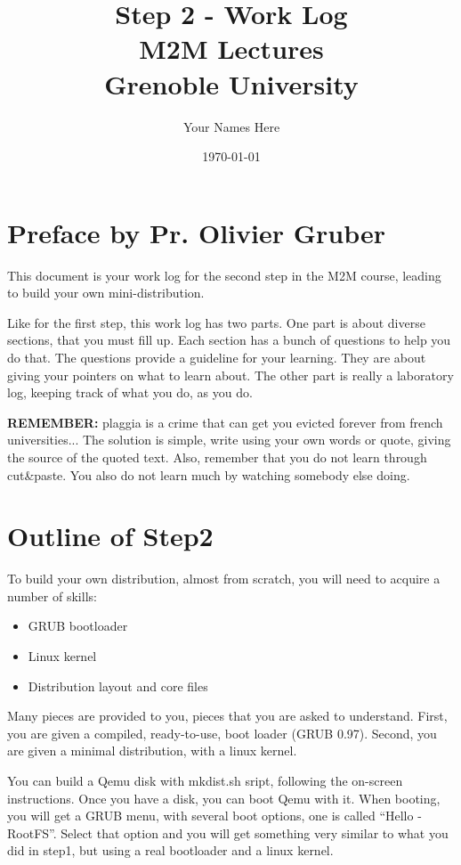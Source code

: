\documentclass[10]{article}
\begin{document}
\title{Step 2 - Work Log \\
M2M Lectures\\
Grenoble University}
\author{Your Names Here}
\date{\today}
\maketitle

\section{Preface by Pr. Olivier Gruber}

This document is your work log for the second step in the 
M2M course, leading to build your own mini-distribution.

Like for the first step, this work log has two parts. 
One part is about diverse sections, that you must fill up.
Each section has a bunch of questions to help you do that.
The questions provide a guideline for your learning. 
They are about giving your pointers on what to learn about.
The other part is really a laboratory log, 
keeping track of what you do, as you do.

{\bf REMEMBER:} plaggia is a crime that can get you evicted
forever from french universities... The solution is simple,
write using your own words or quote, giving the source of
the quoted text. Also, remember that you do not learn through
cut\&paste. You also do not learn much by watching somebody else
doing.

\section{Outline of Step2}

To build your own distribution, almost from scratch, you will need
to acquire a number of skills:

\begin{itemize}
\item
GRUB bootloader
\item
Linux kernel
\item
Distribution layout and core files
\end{itemize}

Many pieces are provided to you, pieces that you are asked to understand.
First, you are given a compiled, ready-to-use, boot loader (GRUB 0.97).
Second, you are given a minimal distribution, with a linux kernel.

You can build a Qemu disk with mkdist.sh sript, following the on-screen
instructions. Once you have a disk, you can boot Qemu with it.
When booting, you will get a GRUB menu, with several boot options,
one is called ``Hello - RootFS''.
Select that option and you will get something very similar 
to what you did in step1, but using a real bootloader and a linux kernel.
\end{document}
